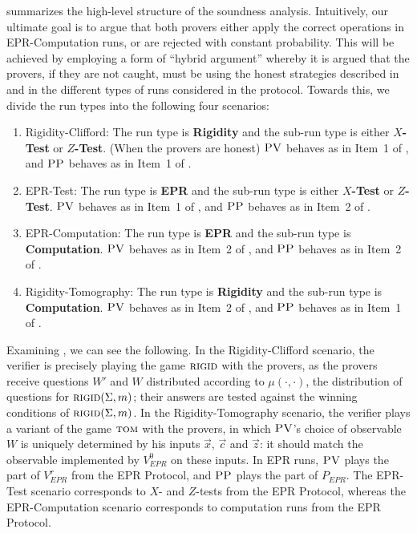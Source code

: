 \documentclass{toc}
\newcommand{\rigid}{\textsc{rigid}}
\newcommand{\tom}{\textsc{tom}}
\newcommand{\pv}{\textsc{PV}}
\newcommand{\pp}{\textsc{PP}}
\begin{document}
 summarizes the high-level structure of the soundness analysis. Intuitively, our ultimate goal is to argue that both provers either apply the correct operations in EPR-Computation runs, or are rejected with constant probability. This will be achieved by employing a form of ``hybrid argument'' whereby it is argued that the provers, if they are not caught, must be using the honest strategies described in  and  in the different types of runs considered in the protocol. Towards this, we divide the run types into the following four scenarios:
\begin{enumerate}
\item Rigidity-Clifford: The run type is \textbf{Rigidity} and the sub-run type is either \textbf{$X$-Test} or \textbf{$Z$-Test}. (When the provers are honest) $\pv$ behaves as in Item~1 of , and $\pp$ behaves as in Item~1 of . 
\item EPR-Test: The run type is \textbf{EPR} and the sub-run type is either \textbf{$X$-Test} or \textbf{$Z$-Test}. $\pv$ behaves as  in Item~1 of , and $\pp$ behaves as in Item~2 of . 
\item EPR-Computation: The run type is \textbf{EPR} and the sub-run type is \textbf{Computation}. $\pv$ behaves as in Item~2 of , and $\pp$ behaves as in Item~2 of . 
\item Rigidity-Tomography: The run type is \textbf{Rigidity} and the sub-run type is \textbf{Computation}. $\pv$ behaves as in Item~2 of , and $\pp$ behaves as in Item~1 of . 
\end{enumerate}
Examining , we can see the following. In the Rigidity-Clifford scenario, the verifier is precisely playing the game $\rigid$ with the provers, as the provers receive questions $W'$ and $W$ distributed according to $\mu(\cdot,\cdot)$, the distribution of questions for $\rigid(\Sigma,m)$; their answers are tested against the winning conditions of $\rigid(\Sigma,m)$. In the Rigidity-Tomography scenario, the verifier plays a variant of the game $\tom$ with the provers, in which $\pv$'s choice of observable $W$ is uniquely determined by his inputs $\vec{x}$, $\vec{c}$ and $\vec{z}$: it should match the observable implemented by $V_{EPR}^0$ on these inputs. In EPR runs, $\pv$ plays the part of $V_{EPR}^r$ from the EPR Protocol, and $\pp$ plays the part of $P_{EPR}$. The EPR-Test scenario corresponds to $X$- and $Z$-tests from the EPR Protocol, whereas the EPR-Computation scenario corresponds to computation runs from the EPR Protocol.
\end{document}
